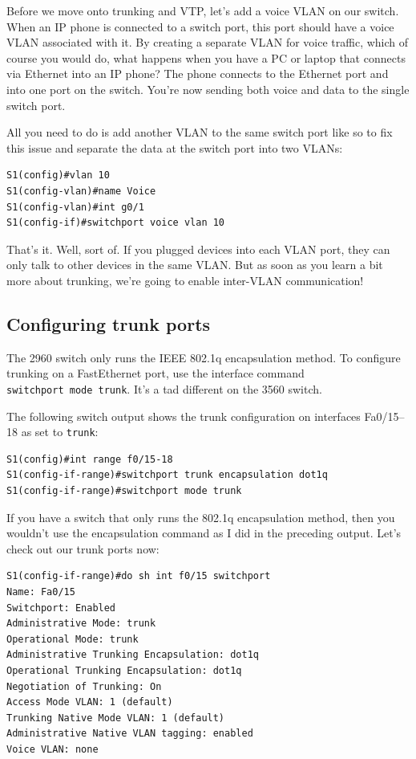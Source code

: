 \documentclass[b5paper,11pt]{memoir}
\begin{document}
Before we move onto trunking and VTP, let's add a voice VLAN on our
switch. When an IP phone is connected to a switch port, this port should
have a voice VLAN associated with it. By creating a separate VLAN for
voice traffic, which of course you would do, what happens when you have
a PC or laptop that connects via Ethernet into an IP phone? The phone
connects to the Ethernet port and into one port on the switch. You're
now sending both voice and data to the single switch port.

All you need to do is add another VLAN to the same switch port like so
to fix this issue and separate the data at the switch port into two
VLANs:

\begin{verbatim}
S1(config)#vlan 10
S1(config-vlan)#name Voice
S1(config-vlan)#int g0/1
S1(config-if)#switchport voice vlan 10
\end{verbatim}

That's it. Well, sort of. If you plugged devices into each VLAN port,
they can only talk to other devices in the same VLAN. But as soon as you
learn a bit more about trunking, we're going to enable inter-VLAN
communication!

\subsection{Configuring trunk ports}

The 2960 switch only runs the IEEE 802.1q encapsulation method. To
configure trunking on a FastEthernet port, use the interface command
\texttt{switchport\ mode\ trunk}. It's a tad different on the 3560
switch.

The following switch output shows the trunk configuration on interfaces
Fa0/15--18 as set to \texttt{trunk}:

\begin{verbatim}
S1(config)#int range f0/15-18
S1(config-if-range)#switchport trunk encapsulation dot1q
S1(config-if-range)#switchport mode trunk
\end{verbatim}

If you have a switch that only runs the 802.1q encapsulation method, then you wouldn't use
the encapsulation command as I did in the preceding output. Let's check
out our trunk ports now:

\begin{verbatim}
S1(config-if-range)#do sh int f0/15 switchport
Name: Fa0/15
Switchport: Enabled
Administrative Mode: trunk
Operational Mode: trunk
Administrative Trunking Encapsulation: dot1q
Operational Trunking Encapsulation: dot1q
Negotiation of Trunking: On
Access Mode VLAN: 1 (default)
Trunking Native Mode VLAN: 1 (default)
Administrative Native VLAN tagging: enabled
Voice VLAN: none
\end{verbatim}
\end{document}
